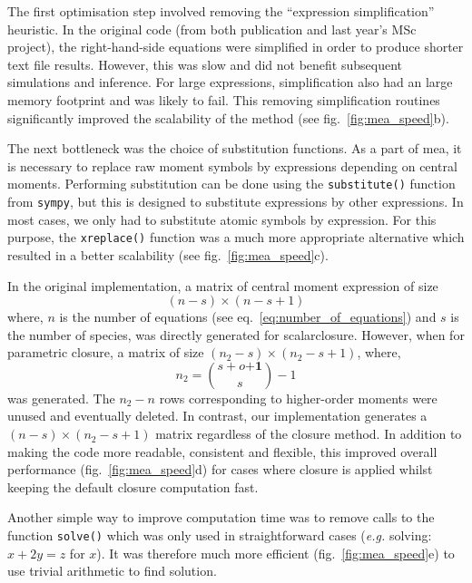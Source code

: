 \documentclass[11pt,a4paper]{article}
\newcommand{\sympy}{\texttt{sympy}}
\newcommand{\eg}{\emph{e.g.}}
\begin{document}
The first optimisation step involved removing the ``expression simplification'' heuristic.
In the original code (from both publication\cite{ale_general_2013} and last year's MSc project\cite{babtie_moment_2013}),
the right-hand-side equations were simplified in order to produce shorter text file results.
However, this was slow and did not benefit subsequent simulations and inference.
For large expressions, simplification also had an large memory footprint and was likely to fail.
This removing simplification routines significantly improved the scalability of the method (see fig.~\ref{fig:mea_speed}b).

The next bottleneck was the choice of substitution functions.
As a part of \gls{mea}, it is necessary to replace raw moment symbols by expressions depending on central moments.
Performing substitution can be done using the \texttt{substitute()} function from \sympy, but this is designed to substitute expressions by other expressions.
In most cases, we only had to substitute atomic symbols by expression.
For this purpose, the \texttt{xreplace()} function was a much more appropriate alternative which resulted in a better scalability (see fig.~\ref{fig:mea_speed}c).

In the original implementation, a matrix of central moment expression of size
\[(n-s) \times (n-s + 1)\]
where,
$n$ is the number of equations (see eq.~\ref{eq:number_of_equations}) and
$s$ is the number of species,
was directly generated for scalarclosure.
However, when for parametric closure, a matrix of size $(n_2-s) \times (n_2-s + 1)$,
where,
\[n_2={{s+o \mathbf{+1}} \choose {s}} -1\]
was generated.
The $n_2 - n$ rows corresponding to higher-order moments were unused and eventually deleted.
In contrast, our implementation generates a $(n-s) \times (n_2-s + 1)$ matrix regardless of the closure method.
In addition to making the code more readable, consistent and flexible, this improved overall performance (fig.~\ref{fig:mea_speed}d)
for cases where closure is applied whilst keeping the default closure computation fast.

Another simple way to improve computation time was to remove calls to the function \texttt{solve()} which was only used in straightforward cases
(\eg{} solving: $x + 2y = z$ for $x$).
It was therefore much more efficient (fig.~\ref{fig:mea_speed}e) to use trivial arithmetic to find solution.
\end{document}
